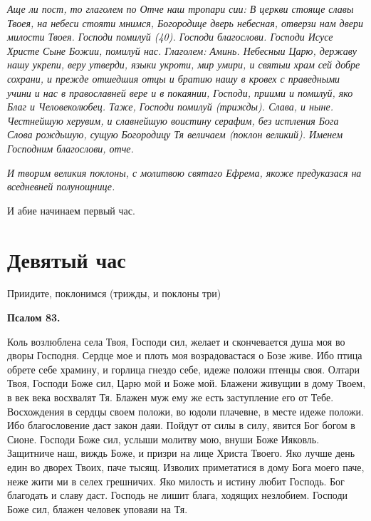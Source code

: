 \itshape Аще ли пост, то глаголем по Отче наш тропари сии:\normalfont{} В церкви стояще славы Твоея, на небеси стояти мнимся, Богородице дверь небесная, отверзи нам двери милости Твоея. Господи помилуй (40). Господи благослови. Господи Исусе Христе Сыне Божии, помилуй нас. Глаголем: Аминь. Небесныи Царю, державу нашу укрепи, веру утверди, языки укроти, мир умири, и святыи храм сей добре сохрани, и прежде отшедшия отцы и братию нашу в кровех с праведными учини и нас в православней вере и в покаянии, Господи, приими и помилуй, яко Благ и Человеколюбец. Таже, Господи помилуй (трижды). Слава, и ныне. Честнейшую херувим, и славнейшую воистину серафим, без истления Бога Слова рождьшую, сущую Богородицу Тя величаем (поклон великий). Именем Господним благослови, отче.


\itshape И творим великия поклоны, с молитвою святаго Ефрема, якоже предуказася на вседневней полунощнице. 

И абие начинаем первый час.\normalfont{}


\section{Девятый час}
 


Приидите, поклонимся (трижды, и поклоны три)


\medskip


\bfseries Псалом 83.\normalfont{}\nopagebreak


Коль возлюблена села Твоя, Господи сил, желает и скончевается душа моя во дворы Господня. Сердце мое и плоть моя возрадовастася о Бозе живе. Ибо птица обрете себе храмину, и горлица гнездо себе, идеже положи птенцы своя. Олтари Твоя, Господи Боже сил, Царю мой и Боже мой. Блажени живущии в дому Твоем, в век века восхвалят Тя. Блажен муж ему же есть заступление его от Тебе. Восхождения в сердцы своем положи, во юдоли плачевне, в месте идеже положи. Ибо благословение даст закон даяи. Пойдут от силы в силу, явится Бог богом в Сионе. Господи Боже сил, услыши молитву мою, внуши Боже Ияковль. Защитниче наш, виждь Боже, и призри на лице Христа Твоего. Яко лучше день един во дворех Твоих, паче тысящ. Изволих приметатися в дому Бога моего паче, неже жити ми в селех грешничих. Яко милость и истину любит Господь. Бог благодать и славу даст. Господь не лишит блага, ходящих незлобием. Господи Боже сил, блажен человек уповаяи на Тя.


\medskip


